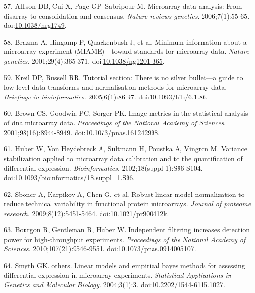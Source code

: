 \documentclass[]{article}
\begin{document}
\hypertarget{ref-allison2006}{}
57. Allison DB, Cui X, Page GP, Sabripour M. Microarray data analysis:
From disarray to consolidation and consensus. \emph{Nature reviews
genetics}. 2006;7(1):55-65.
doi:\href{https://doi.org/10.1038/nrg1749}{10.1038/nrg1749}.

\hypertarget{ref-brazma2001}{}
58. Brazma A, Hingamp P, Quackenbush J, et al. Minimum information about
a microarray experiment (MIAME)---toward standards for microarray data.
\emph{Nature genetics}. 2001;29(4):365-371.
doi:\href{https://doi.org/10.1038/ng1201-365}{10.1038/ng1201-365}.

\hypertarget{ref-kreil2005bullet}{}
59. Kreil DP, Russell RR. Tutorial section: There is no silver
bullet---a guide to low-level data transforms and normalisation methods
for microarray data. \emph{Briefings in bioinformatics}.
2005;6(1):86-97.
doi:\href{https://doi.org/10.1093/bib/6.1.86}{10.1093/bib/6.1.86}.

\hypertarget{ref-brown2001image}{}
60. Brown CS, Goodwin PC, Sorger PK. Image metrics in the statistical
analysis of dna microarray data. \emph{Proceedings of the National
Academy of Sciences}. 2001;98(16):8944-8949.
doi:\href{https://doi.org/10.1073/pnas.161242998}{10.1073/pnas.161242998}.

\hypertarget{ref-huber2002vsn}{}
61. Huber W, Von Heydebreck A, Sültmann H, Poustka A, Vingron M.
Variance stabilization applied to microarray data calibration and to the
quantification of differential expression. \emph{Bioinformatics}.
2002;18(suppl 1):S96-S104.
doi:\href{https://doi.org/10.1093/bioinformatics/18.suppl_1.S96}{10.1093/bioinformatics/18.suppl\_1.S96}.

\hypertarget{ref-sboner2009rlm}{}
62. Sboner A, Karpikov A, Chen G, et al. Robust-linear-model
normalization to reduce technical variability in functional protein
microarrays. \emph{Journal of proteome research}. 2009;8(12):5451-5464.
doi:\href{https://doi.org/10.1021/pr900412k}{10.1021/pr900412k}.

\hypertarget{ref-bourgon2010filter}{}
63. Bourgon R, Gentleman R, Huber W. Independent filtering increases
detection power for high-throughput experiments. \emph{Proceedings of
the National Academy of Sciences}. 2010;107(21):9546-9551.
doi:\href{https://doi.org/10.1073/pnas.0914005107}{10.1073/pnas.0914005107}.

\hypertarget{ref-smyth2004ebayes}{}
64. Smyth GK, others. Linear models and empirical bayes methods for
assessing differential expression in microarray experiments.
\emph{Statistical Applications in Genetics and Molecular Biology}.
2004;3(1):3.
doi:\href{https://doi.org/10.2202/1544-6115.1027}{10.2202/1544-6115.1027}.
\end{document}
